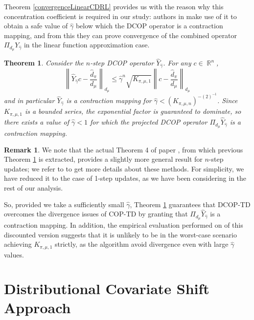 \documentclass[12pt,a4paper,openright,twoside]{article}
\DeclareMathOperator*{\R}{\mathbb{R}}
\numberwithin{equation}{section}
\newtheorem{theorem}{Theorem}[section]
\theoremstyle{definition}
\newtheorem*{remark}{Remark}
\theoremstyle{remark}
\theoremstyle{plain}
\begin{document}
Theorem \ref{convergenceLinearCDRL} provides us with the reason why this concentration coefficient is required in our study: authors in \cite{DCOPTD} make use of it to obtain a safe value of $\hat{\gamma}$ below which the DCOP operator is a contraction mapping, and from this they can prove convergence of the combined operator $\Pi_{d_\mu} Y_{\hat{\gamma}}$ in the linear function approximation case. 
\begin{theorem} \label{convergenceLinearDCOP}
	Consider the $n$-step DCOP operator $\hat{Y}_{\hat{\gamma}}$. For any $c \in \R^n$,
	\begin{equation*}
		\left\| \hat{Y}_{\hat{\gamma}} c - \frac{\hat{d}_\pi}{d_\mu} \right\|_{d_\mu} \leq \hat{\gamma}^n \sqrt{K_{\pi,\mu,1}} \left\| c - \frac{\hat{d}_\pi}{d_\mu} \right\|_{d_\mu}
	\end{equation*}
	and in particular $\hat{Y}_{\hat{\gamma}}$ is a contraction mapping for $\hat{\gamma} < (K_{\pi,\mu,n})^{-(2)^{-1}}$. Since $K_{\pi,\mu,1}$ is a bounded series, the exponential factor is guaranteed to dominate, so there exists a value of $\hat{\gamma} < 1$ for which the projected DCOP operator $\Pi_{d_\mu} \hat{Y}_{\hat{\gamma}}$ is a contraction mapping.
\end{theorem}

\begin{remark}
	We note that the actual Theorem 4 of paper \cite{DCOPTD}, from which previous Theorem \ref{convergenceLinearDCOP} is extracted, provides a slightly more general result for $n$-step updates; we refer to \cite{TD} to get more details about these methods. For simplicity, we have reduced it to the case of 1-step updates, as we have been considering in the rest of our analysis.
\end{remark}

So, provided we take a sufficiently small $\hat{\gamma}$, Theorem \ref{convergenceLinearDCOP} guarantees that DCOP-TD overcomes the divergence issues of COP-TD by granting that $\Pi_{d_\mu} \hat{Y}_{\hat{\gamma}}$ is a contraction mapping. In addition, the empirical evaluation performed on \cite{DCOPTD} of this discounted version suggests that it is unlikely to be in the worst-case scenario achieving $K_{\pi,\mu,1}$ strictly, as the algorithm avoid divergence even with large $\hat{\gamma}$ values.




\newpage

\thispagestyle{plain}
\section{Distributional Covariate Shift Approach}
\end{document}
